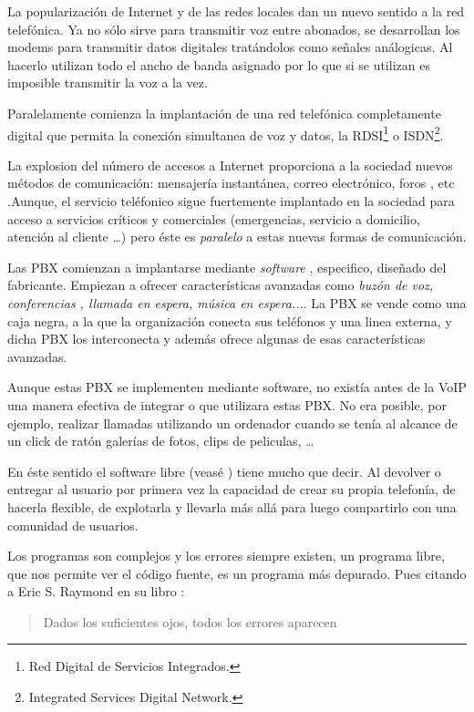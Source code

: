 La popularización de Internet y de las redes locales dan un nuevo sentido a la red telefónica. Ya no sólo sirve para transmitir voz entre abonados, se desarrollan los modems para transmitir datos digitales tratándolos como señales análogicas. Al hacerlo utilizan todo el ancho de banda asignado por lo que si se utilizan es imposible transmitir la voz a la vez. 

Paralelamente comienza la implantación de una red telefónica completamente digital que permita la conexión simultanea de voz y datos, la RDSI\footnote{Red Digital de Servicios Integrados.} o ISDN\footnote{Integrated Services Digital Network.}. 

La explosion del número de accesos a Internet proporciona a la sociedad nuevos métodos de comunicación: mensajería instantánea, correo electrónico, foros , etc .Aunque, el servicio teléfonico sigue fuertemente implantado en la sociedad para acceso a servicios críticos y comerciales (emergencias, servicio a domicilio, atención al cliente \ldots) pero éste es \emph{paralelo} a estas nuevas formas de comunicación.

Las PBX comienzan a implantarse mediante \emph{software} , especifico, diseñado del fabricante. Empiezan a ofrecer características avanzadas como \emph{buzón de voz, conferencias , llamada en espera, música en espera...}. La PBX se vende como una caja negra, a la que la organización conecta sus teléfonos y una linea externa, y dicha PBX los interconecta y además ofrece algunas de esas características avanzadas. 

Aunque estas PBX se implementen mediante software, no existía antes de la VoIP una manera efectiva de integrar o que utilizara estas PBX. No era posible, por ejemplo, realizar llamadas utilizando un ordenador cuando se tenía al alcance de un click de ratón galerías de fotos, clips de peliculas, \ldots

En éste sentido el software libre (veasé \cite{stallman-sl}) tiene mucho que decir. Al devolver o entregar al usuario por primera vez la capacidad de crear su propia telefonía, de hacerla flexible, de explotarla y llevarla más allá para luego compartirlo con una comunidad de usuarios.
 
Los programas son complejos y los errores siempre existen, un programa libre, que nos permite ver el código fuente, es un programa más depurado. Pues citando a Eric S. Raymond en su libro \cite{cathedral-y-bazaar}:
\begin{quotation}
  Dados los suficientes ojos, todos los errores aparecen
\end{quotation}


